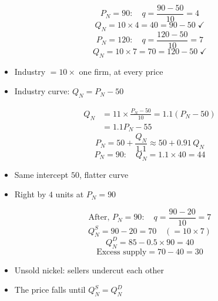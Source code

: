 \begin{frame}[plain,label=w2_rn_q13]
  \Large
  \[
    \tag{22}\;P_N = 90: \quad q = \frac{90 - 50}{10} = 4
  \]
  \[
    \tag{23}\;Q_N = 10 \times 4 = 40 = 90 - 50 \;\checkmark
  \]
  \[
    \tag{24}\;P_N = 120: \quad q = \frac{120 - 50}{10} = 7
  \]
  \[
    \tag{25}\;Q_N = 10 \times 7 = 70 = 120 - 50 \;\checkmark
  \]

  \vspace{0.5em}
  \begin{itemize}\Large
    \item Industry $= 10 \times$ one firm, at every price
    \item Industry curve: $Q_N = P_N - 50$
  \end{itemize}
\end{frame}

\ifnum{}
\begin{frame}[plain,label=w2_ans_q13c]
  \Large
  \begin{align*}
    \tag{M11}\;Q_N &= 11 \times \frac{P_N - 50}{10} = 1.1(P_N - 50)\\
                  &= 1.1P_N - 55
  \end{align*}
  \[
    \tag{M12}\;P_N = 50 + \frac{Q_N}{1.1} \approx 50 + 0.91\,Q_N
  \]
  \[
    \tag{M13}\;P_N = 90: \quad Q_N = 1.1 \times 40 = 44
  \]

  \vspace{0.3em}
  \begin{itemize}\Large
    \item Same intercept $50$, flatter curve
    \item Right by $4$ units at $P_N = 90$
  \end{itemize}
\end{frame}
\fi

\begin{frame}[plain,label=w2_rn_q14]
  \Large
  \[
    \tag{29}\;\text{After, } P_N = 90: \quad q = \frac{90 - 20}{10} = 7
  \]
  \[
    \tag{30}\;Q^S_N = 90 - 20 = 70 \quad (= 10 \times 7)
  \]
  \[
    \tag{31}\;Q^D_N = 85 - 0.5 \times 90 = 40
  \]
  \[
    \tag{32}\;\text{Excess supply} = 70 - 40 = 30
  \]

  \vspace{0.3em}
  \begin{itemize}\Large
    \item Unsold nickel: sellers undercut each other
    \item The price falls until $Q^S_N = Q^D_N$
  \end{itemize}
\end{frame}

